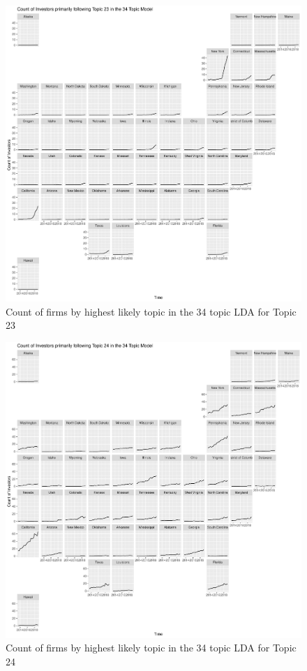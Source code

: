 \begin{figure}
	\centering
	\includegraphics[width=1\linewidth]{Figures/ChapterV/USA_34_Topic23.pdf}
	\caption[Count of firm for Topic 23 by quarter]{Count of firms by highest likely topic in the 34 topic LDA for Topic 23}
	\label{fig:StateLDA23}
\end{figure}

\begin{figure}
	\centering
	\includegraphics[width=1\linewidth]{Figures/ChapterV/USA_34_Topic24.pdf}
	\caption[Count of firm for Topic 24 by quarter]{Count of firms by highest likely topic in the 34 topic LDA for Topic 24}
	\label{fig:StateLDA24}
\end{figure}

